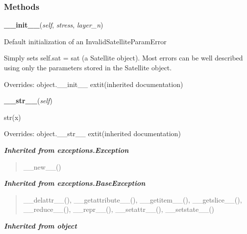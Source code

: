   \subsubsection{Methods}

    \vspace{0.5ex}

\hspace{.8\funcindent}\begin{boxedminipage}{\funcwidth}

    \raggedright \textbf{\_\_init\_\_}(\textit{self}, \textit{stress}, \textit{layer\_n})

\setlength{\parskip}{2ex}
    Default initialization of an InvalidSatelliteParamError

    Simply sets self.sat = sat (a Satellite object).  Most errors can be 
    well described using only the parameters stored in the Satellite 
    object.

\setlength{\parskip}{1ex}
      Overrides: object.\_\_init\_\_ 	extit{(inherited documentation)}

    \end{boxedminipage}

    \vspace{0.5ex}

\hspace{.8\funcindent}\begin{boxedminipage}{\funcwidth}

    \raggedright \textbf{\_\_str\_\_}(\textit{self})

\setlength{\parskip}{2ex}
    str(x)

\setlength{\parskip}{1ex}
      Overrides: object.\_\_str\_\_ 	extit{(inherited documentation)}

    \end{boxedminipage}


\large{\textbf{\textit{Inherited from exceptions.Exception}}}

\begin{quote}
\_\_new\_\_()
\end{quote}

\large{\textbf{\textit{Inherited from exceptions.BaseException}}}

\begin{quote}
\_\_delattr\_\_(), \_\_getattribute\_\_(), \_\_getitem\_\_(), \_\_getslice\_\_(), \_\_reduce\_\_(), \_\_repr\_\_(), \_\_setattr\_\_(), \_\_setstate\_\_()
\end{quote}

\large{\textbf{\textit{Inherited from object}}}

